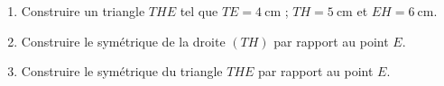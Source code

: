 
\begin{exercice}\label{exosmath-0991}

    \begin{enumerate}
        \item
    Construire un triangle $THE$ tel que $TE =\SI{4}{\centi\meter}$ ; $TH = \SI{5}{\centi\meter}$ et $EH = \SI{6}{\centi\meter}$. 
\item
    Construire le symétrique de la droite $(TH)$ par rapport au point $E$.
\item
    Construire le symétrique du triangle \( THE\) par rapport au point \( E\).
    \end{enumerate}

\end{exercice}
